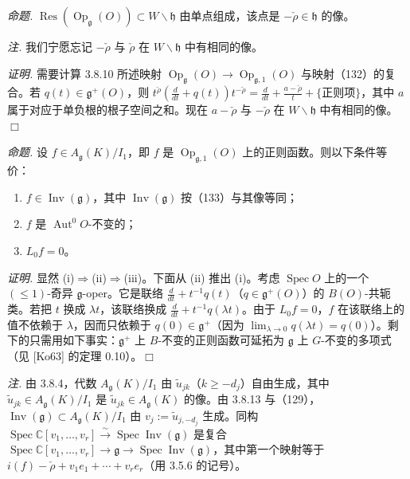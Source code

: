  \emph{命题.} $\operatorname{Res}(\operatorname{Op}_{\mathfrak{g}}(O))\subset W\backslash\mathfrak{h}$ 由单点组成，该点是 $-\check\rho\in\mathfrak{h}$ 的像。

\emph{注.} 我们宁愿忘记 $-\check\rho$ 与 $\check\rho$ 在 $W\backslash\mathfrak{h}$ 中有相同的像。

\emph{证明.} 需要计算 3.8.10 所述映射 $\operatorname{Op}_{\mathfrak{g}}(O)\to\operatorname{Op}_{\mathfrak{g},1}(O)$ 与映射（132）的复合。若 $q(t)\in\mathfrak{g}^{+}(O)$，则 $t^{\check\rho}(\frac{d}{dt}+q(t))t^{-\check\rho}=\frac{d}{dt}+\frac{a-\check\rho}{t}+\{\text{正则项}\}$，其中 $a$ 属于对应于单负根的根子空间之和。现在 $a-\check\rho$ 与 $-\check\rho$ 在 $W\backslash\mathfrak{h}$ 中有相同的像。\hfill$\Box$

 \emph{命题.} 设 $f\in A_{\mathfrak{g}}(K)/I_{1}$，即 $f$ 是 $\operatorname{Op}_{\mathfrak{g},1}(O)$ 上的正则函数。则以下条件等价：
\begin{enumerate}[label=(\roman*),leftmargin=2.2em]
\item $f\in\operatorname{Inv}(\mathfrak{g})$，其中 $\operatorname{Inv}(\mathfrak{g})$ 按（133）与其像等同；
\item $f$ 是 $\operatorname{Aut}^{0}O$-不变的；
\item $L_{0}f=0$。
\end{enumerate}

\emph{证明.} 显然 (i)$\Rightarrow$(ii)$\Rightarrow$(iii)。下面从 (ii) 推出 (i)。考虑 $\operatorname{Spec}O$ 上的一个 $(\le 1)$-奇异 $\mathfrak{g}$-oper。它是联络 $\frac{d}{dt}+t^{-1}q(t)$（$q\in\mathfrak{g}^{+}(O)$）的 $B(O)$-共轭类。若把 $t$ 换成 $\lambda t$，该联络换成 $\frac{d}{dt}+t^{-1}q(\lambda t)$。由于 $L_{0}f=0$，$f$ 在该联络上的值不依赖于 $\lambda$，因而只依赖于 $q(0)\in\mathfrak{g}^{+}$（因为 $\lim_{\lambda\to 0}q(\lambda t)=q(0)$）。剩下的只需用如下事实：$\mathfrak{g}^{+}$ 上 $B$-不变的正则函数可延拓为 $\mathfrak{g}$ 上 $G$-不变的多项式（见 [Ko63] 的定理 0.10）。\hfill$\Box$

 \emph{注.} 由 3.8.4，代数 $A_{\mathfrak{g}}(K)/I_{1}$ 由 $\tilde{u}_{jk}$（$k\ge -d_{j}$）自由生成，其中 $\tilde{u}_{jk}\in A_{\mathfrak{g}}(K)/I_{1}$ 是 $\tilde{u}_{jk}\in A_{\mathfrak{g}}(K)$ 的像。由 3.8.13 与（129），$\operatorname{Inv}(\mathfrak{g})\subset A_{\mathfrak{g}}(K)/I_{1}$ 由 $v_{j}:=\tilde{u}_{j,-d_{j}}$ 生成。同构 $\operatorname{Spec}\mathbb{C}[v_{1},\ldots,v_{r}]\xrightarrow{\sim}\operatorname{Spec}\operatorname{Inv}(\mathfrak{g})$ 是复合 $\operatorname{Spec}\mathbb{C}[v_{1},\ldots,v_{r}]\to\mathfrak{g}\to\operatorname{Spec}\operatorname{Inv}(\mathfrak{g})$，其中第一个映射等于 $i(f)-\check\rho+v_{1}e_{1}+\cdots+v_{r}e_{r}$（用 3.5.6 的记号）。

